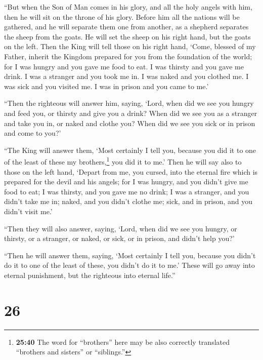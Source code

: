 ``But when the Son of Man comes in his glory, and all
the holy angels with him, then he will sit on the throne of his glory.
 Before him all the nations will be gathered, and he will
separate them one from another, as a shepherd separates the sheep from
the goats.  He will set the sheep on his right hand, but
the goats on the left.  Then the King will tell those on
his right hand, `Come, blessed of my Father, inherit the Kingdom
prepared for you from the foundation of the world;  for I
was hungry and you gave me food to eat. I was thirsty and you gave me
drink. I was a stranger and you took me in.  I was naked
and you clothed me. I was sick and you visited me. I was in prison and
you came to me.'

 ``Then the righteous will answer him, saying, `Lord,
when did we see you hungry and feed you, or thirsty and give you a
drink?  When did we see you as a stranger and take you
in, or naked and clothe you?  When did we see you sick or
in prison and come to you?'

 ``The King will answer them, `Most certainly I tell you,
because you did it to one of the least of these my brothers,\footnote{\textbf{25:40}
  The word for ``brothers'' here may be also correctly translated
  ``brothers and sisters'' or ``siblings.''} you did it to me.'
 Then he will say also to those on the left hand, `Depart
from me, you cursed, into the eternal fire which is prepared for the
devil and his angels;  for I was hungry, and you didn't
give me food to eat; I was thirsty, and you gave me no drink;
 I was a stranger, and you didn't take me in; naked, and
you didn't clothe me; sick, and in prison, and you didn't visit me.'

 ``Then they will also answer, saying, `Lord, when did we
see you hungry, or thirsty, or a stranger, or naked, or sick, or in
prison, and didn't help you?'

 ``Then he will answer them, saying, `Most certainly I
tell you, because you didn't do it to one of the least of these, you
didn't do it to me.'  These will go away into eternal
punishment, but the righteous into eternal life.''

\hypertarget{section-25}{%
\section{26}\label{section-25}}

